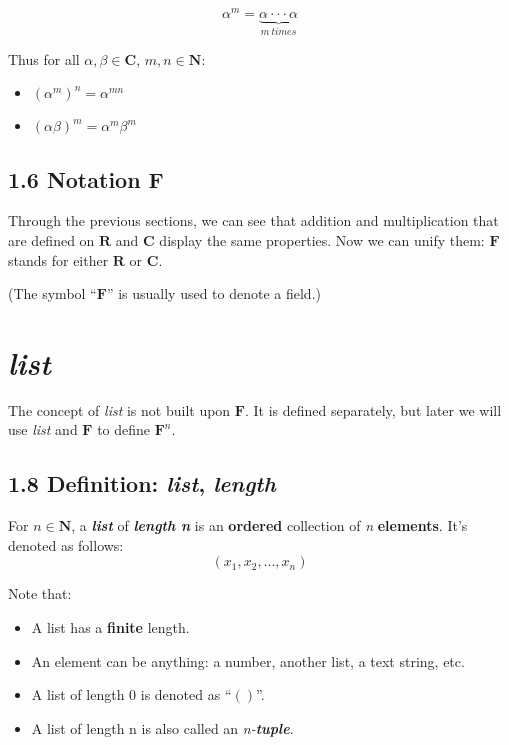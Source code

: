 \documentclass[12pt, letterpaper, oneside]{book}
\begin{document}
\[ \alpha^m = \underbrace{\alpha\cdot\cdot\cdot\alpha}_{m \ times} \]

Thus for all $\alpha, \beta \in \mathbf{C}$, $m, n \in \mathbf{N}$:

\begin{itemize}
  \item $(\alpha^m)^n = \alpha^{mn}$
  \item $(\alpha\beta)^m = \alpha^m\beta^m$
\end{itemize}

\subsection{1.6 Notation F}

Through the previous sections, we can see that addition and multiplication that
are defined on $\mathbf{R}$ and $\mathbf{C}$ display the same properties. Now
we can unify them: $\mathbf{F}$ stands for either $\mathbf{R}$ or $\mathbf{C}$.

(The symbol ``$\mathbf{F}$'' is usually used to denote a field.)

\section{\textbf{\textit{list}}}

The concept of \textit{list} is not built upon $\mathbf{F}$. It is defined
separately, but later we will use \textit{list} and $\mathbf{F}$ to define
$\mathbf{F}^n$.

\subsection{1.8 Definition: \textit{list}, \textit{length}}

For $n \in \mathbf{N}$, a \textbf{\textit{list}} of \textbf{\textit{length n}}
is an \textbf{ordered} collection of \textit{n} \textbf{elements}. It's denoted
as follows: \[ (x_1, x_2, ..., x_n) \]

Note that:
\begin{itemize}
  \item A list has a \textbf{finite} length.
  \item An element can be anything: a number, another list, a text string, etc.
  \item A list of length 0 is denoted as ``$()$''.
  \item A list of length n is also called an \textit{n-\textbf{tuple}}.
\end{itemize}
\end{document}
